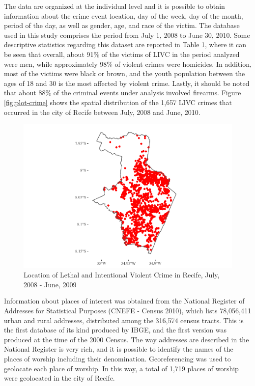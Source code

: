 \documentclass[smallextended]{svjour3}       %
\begin{document}
The data are organized at the individual level and it is possible to
obtain information about the crime event location, day of the week, day
of the month, period of the day, as well as gender, age, and race of the
victim. The database used in this study comprises the period from July
1, 2008 to June 30, 2010. Some descriptive statistics regarding this
dataset are reported in Table 1, where it can be seen that overall,
about 91\% of the victims of LIVC in the period analyzed were men, while
approximately 98\% of violent crimes were homicides. In addition, most
of the victims were black or brown, and the youth population between the
ages of 18 and 30 is the most affected by violent crime. Lastly, it
should be noted that about 88\% of the criminal events under analysis
involved firearms. Figure \ref{fig:plot-crime} shows the spatial
distribution of the 1,657 LIVC crimes that occurred in the city of
Recife between July, 2008 and June, 2010.

\begin{figure}

\includegraphics{Moral_Communities_and_Crime_files/figure-latex/fig-plot-crime-1} \hfill{}

\caption{\label{fig:plot-crime}Location of Lethal and Intentional Violent Crime in Recife, July, 2008 - June, 2009}\label{fig:fig-plot-crime}
\end{figure}

Information about places of interest was obtained from the National
Register of Addresses for Statistical Purposes (CNEFE - Census 2010),
which lists 78,056,411 urban and rural addresses, distributed among the
316,574 census tracts. This is the first database of its kind produced
by IBGE, and the first version was produced at the time of the 2000
Census. The way addresses are described in the National Register is very
rich, and it is possible to identify the names of the places of worship
including their denomination. Georeferencing was used to geolocate each
place of worship. In this way, a total of 1,719 places of worship were
geolocated in the city of Recife.
\end{document}
